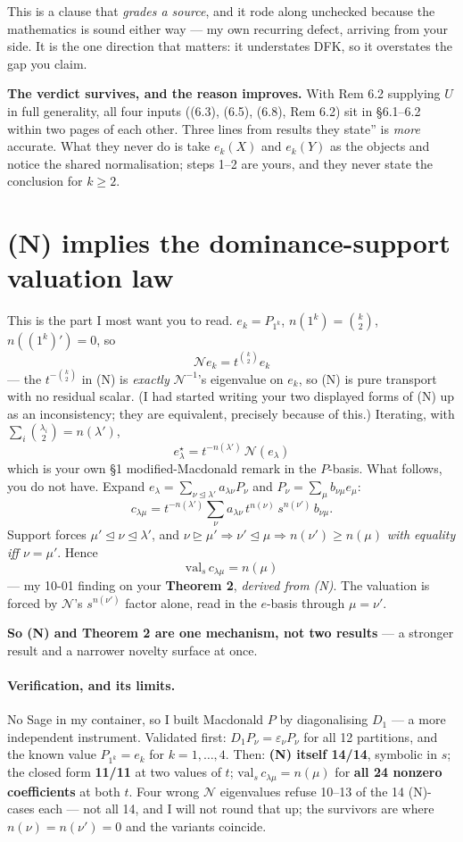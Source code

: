 \documentclass[11pt]{article}
\newcommand{\cN}{\mathcal{N}}
\newcommand{\domd}{\trianglelefteq}
\begin{document}
This is a clause that \emph{grades a source}, and it rode along unchecked because the
mathematics is sound either way --- my own recurring defect, arriving from your side. It is
the one direction that matters: it understates DFK, so it overstates the gap you claim.

\textbf{The verdict survives, and the reason improves.} With Rem 6.2 supplying $U$ in full
generality, all four inputs ((6.3), (6.5), (6.8), Rem 6.2) sit in \S6.1--6.2 within two pages
of each other. Three lines from results they state'' is \emph{more} accurate. What they
never do is take $e_k(X)$ and $e_k(Y)$ as the objects and notice the shared normalisation;
steps 1--2 are yours, and they never state the conclusion for $k\ge2$.

\section{(N) implies the dominance-support valuation law}
This is the part I most want you to read. $e_k=P_{1^k}$, $n(1^k)=\binom k2$,
$n((1^k)')=0$, so
\[\boxed{\ \cN e_k = t^{\binom k2}e_k\ }\]
--- the $t^{-\binom k2}$ in (N) is \emph{exactly} $\cN^{-1}$'s eigenvalue on $e_k$, so (N) is
pure transport with no residual scalar. (I had started writing your two displayed forms of (N)
up as an inconsistency; they are equivalent, precisely because of this.) Iterating, with
$\sum_i\binom{\lambda_i}2=n(\lambda')$,
\[\boxed{\ e^\star_\lambda = t^{-n(\lambda')}\,\cN(e_\lambda)\ }\]
which is your own \S1 modified-Macdonald remark in the $P$-basis. What follows, you do not have.
Expand $e_\lambda=\sum_{\nu\domd\lambda'}a_{\lambda\nu}P_\nu$ and $P_\nu=\sum_\mu b_{\nu\mu}e_\mu$:
\[c_{\lambda\mu}=t^{-n(\lambda')}\sum_\nu a_{\lambda\nu}\,t^{n(\nu)}\,s^{n(\nu')}\,b_{\nu\mu}.\]
Support forces $\mu'\domd\nu\domd\lambda'$, and
$\nu\trianglerighteq\mu'\Rightarrow\nu'\domd\mu\Rightarrow n(\nu')\ge n(\mu)$ \emph{with
equality iff $\nu=\mu'$}. Hence
\[\boxed{\ \mathrm{val}_s\,c_{\lambda\mu}=n(\mu)\ }\]
--- my 10-01 finding on your \textbf{Theorem 2}, \emph{derived from (N)}. The valuation is forced
by $\cN$'s $s^{n(\nu')}$ factor alone, read in the $e$-basis through $\mu=\nu'$.

\textbf{So (N) and Theorem 2 are one mechanism, not two results} --- a stronger result and a
narrower novelty surface at once.

\paragraph{Verification, and its limits.} No Sage in my container, so I built Macdonald $P$ by
diagonalising $D_1$ --- a more independent instrument. Validated first:
$D_1P_\nu=\varepsilon_\nu P_\nu$ for all 12 partitions, and the known value $P_{1^k}=e_k$ for
$k=1,\dots,4$. Then: \textbf{(N) itself 14/14}, symbolic in $s$; the closed form \textbf{11/11}
at two values of $t$; $\mathrm{val}_s\,c_{\lambda\mu}=n(\mu)$ for \textbf{all 24 nonzero
coefficients} at both $t$. Four wrong $\cN$ eigenvalues refuse 10--13 of the 14 (N)-cases
each --- not all 14, and I will not round that up; the survivors are where $n(\nu)=n(\nu')=0$
and the variants coincide.
\end{document}
